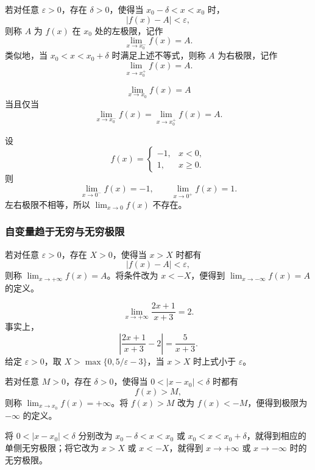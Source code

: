 \documentclass[fontset=fandol]{ctexart}
\begin{document}
\begin{definition}[左极限与右极限]
若对任意 \(\varepsilon>0\)，存在 \(\delta>0\)，使得当 \(x_0-\delta<x<x_0\) 时，
\[
|f(x)-A|<\varepsilon,
\]
则称 \(A\) 为 \(f(x)\) 在 \(x_0\) 处的左极限，记作
\[
\lim_{x\to x_0^-}f(x)=A.
\]
类似地，当 \(x_0<x<x_0+\delta\) 时满足上述不等式，则称 \(A\) 为右极限，记作
\[
\lim_{x\to x_0^+}f(x)=A.
\]
\end{definition}

\begin{theorem}[双侧极限存在的充要条件]
\[
\lim_{x\to x_0}f(x)=A
\]
当且仅当
\[
\lim_{x\to x_0^-}f(x)=\lim_{x\to x_0^+}f(x)=A.
\]
\end{theorem}

\begin{example}[左右极限不相等]
设
\[
f(x)=
\begin{cases}
-1,&x<0,\\
1,&x\geq0.
\end{cases}
\]
则
\[
\lim_{x\to0^-}f(x)=-1,\qquad
\lim_{x\to0^+}f(x)=1.
\]
左右极限不相等，所以 \(\lim_{x\to0}f(x)\) 不存在。
\end{example}

\subsubsection*{自变量趋于无穷与无穷极限}

\begin{definition}[自变量趋于无穷时的有限极限]
若对任意 \(\varepsilon>0\)，存在 \(X>0\)，使得当 \(x>X\) 时都有
\[
|f(x)-A|<\varepsilon,
\]
则称 \(\lim_{x\to+\infty}f(x)=A\)。将条件改为 \(x<-X\)，便得到 \(\lim_{x\to-\infty}f(x)=A\) 的定义。
\end{definition}

\begin{example}
\[
\lim_{x\to+\infty}\frac{2x+1}{x+3}=2.
\]
事实上，
\[
\left|\frac{2x+1}{x+3}-2\right|=\frac5{x+3}.
\]
给定 \(\varepsilon>0\)，取 \(X>\max\{0,5/\varepsilon-3\}\)，当 \(x>X\) 时上式小于 \(\varepsilon\)。
\end{example}

\begin{definition}[无穷极限]
若对任意 \(M>0\)，存在 \(\delta>0\)，使得当 \(0<|x-x_0|<\delta\) 时都有
\[
f(x)>M,
\]
则称 \(\lim_{x\to x_0}f(x)=+\infty\)。将 \(f(x)>M\) 改为 \(f(x)<-M\)，便得到极限为 \(-\infty\) 的定义。

将 \(0<|x-x_0|<\delta\) 分别改为 \(x_0-\delta<x<x_0\) 或 \(x_0<x<x_0+\delta\)，就得到相应的单侧无穷极限；将它改为 \(x>X\) 或 \(x<-X\)，就得到 \(x\to+\infty\) 或 \(x\to-\infty\) 时的无穷极限。
\end{definition}
\end{document}
